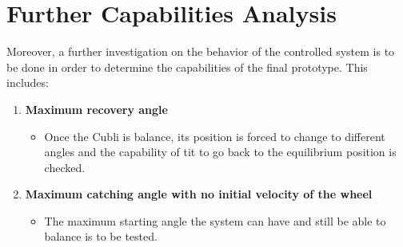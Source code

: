 \section{Further Capabilities Analysis}\label{title}
Moreover, a further investigation on the behavior of the controlled system is to be done in order to determine the capabilities of the final prototype. This includes:
\begin{enumerate}
%
	\item \textbf{Maximum recovery angle}
	\begin{itemize}
		\item[] Once the Cubli is balance, its position is forced to change to different angles and the capability of tit to go back to the equilibrium position is checked. 
	\end{itemize}
	
	\item \textbf{Maximum catching angle with no initial velocity of the wheel}
	\begin{itemize}
		\item[] The maximum starting angle the system can have and still be able to balance is to be tested.\\
	\end{itemize}
	
\end{enumerate}